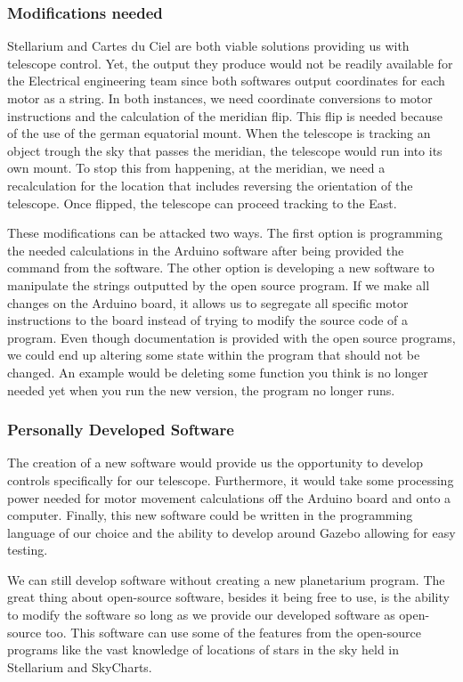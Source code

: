 \documentclass[12pt]{article}
\begin{document}
\subsubsection{Modifications needed}

Stellarium and Cartes du Ciel are both viable solutions providing us with telescope control. Yet, the output they produce would not be readily available for the Electrical engineering team since both softwares output coordinates for each motor as a string. In both instances, we need coordinate conversions to motor instructions and the calculation of the meridian flip. This flip is needed because of the use of the german equatorial mount. When the telescope is tracking an object trough the sky that passes the meridian, the telescope would run into its own mount. To stop this from happening, at the meridian, we need a recalculation for the location that includes reversing the orientation of the telescope. Once flipped, the telescope can proceed tracking to the East.

These modifications can be attacked two ways. The first option is programming the needed calculations in the Arduino software after being provided the command from the software. The other option is developing a new software to manipulate the strings outputted by the open source program. If we make all changes on the Arduino board, it allows us to segregate all specific motor instructions to the board instead of trying to modify the source code of a program. Even though documentation is provided with the open source programs, we could end up altering some state within the program that should not be changed. An example would be deleting some function you think is no longer needed yet when you run the new version, the program no longer runs.

\subsubsection{Personally Developed Software}

The creation of a new software would provide us the opportunity to develop controls specifically for our telescope. Furthermore, it would take some processing power needed for motor movement calculations off the Arduino board and onto a computer. Finally, this new software could be written in the programming language of our choice and the ability to develop around Gazebo allowing for easy testing.

We can still develop software without creating a new planetarium program. The great thing about open-source software, besides it being free to use, is the ability to modify the software so long as we provide our developed software as open-source too. This software can use some of the features from the open-source programs like the vast knowledge of locations of stars in the sky held in Stellarium and SkyCharts.
\end{document}
